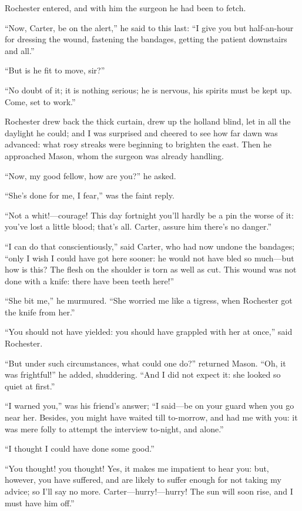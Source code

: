 \Mr{} Rochester entered, and with him the surgeon he had been to fetch.

\enquote{Now, Carter, be on the alert,} he said to this last: \enquote{I
give you but half-an-hour for dressing the wound, fastening the
bandages, getting the patient downstairs and all.}

\enquote{But is he fit to move, sir?}

\enquote{No doubt of it; it is nothing serious; he is nervous, his
spirits must be kept up. Come, set to work.}

\Mr{} Rochester drew back the thick curtain, drew up the holland blind,
let in all the daylight he could; and I was surprised and cheered to see
how far dawn was advanced: what rosy streaks were beginning to brighten
the east. Then he approached Mason, whom the surgeon was already
handling.

\enquote{Now, my good fellow, how are you?} he asked.

\enquote{She's done for me, I fear,} was the faint reply.

\enquote{Not a whit!---courage! This day fortnight you'll hardly be a
pin the worse of it: you've lost a little blood; that's all. Carter,
assure him there's no danger.}

\enquote{I can do that conscientiously,} said Carter, who had now undone
the bandages; \enquote{only I wish I could have got here sooner: he
would not have bled so much---but how is this? The flesh on the
shoulder is torn as well as cut. This wound was not done with a knife:
there have been teeth here!}

\enquote{She bit me,} he murmured. \enquote{She worried me like a
tigress, when Rochester got the knife from her.}

\enquote{You should not have yielded: you should have grappled with her
at once,} said \Mr{} Rochester.

\enquote{But under such circumstances, what could one do?} returned
Mason. \enquote{Oh, it was frightful!} he added, shuddering. 
\enquote{And I did not expect it: she looked so quiet at first.}

\enquote{I warned you,} was his friend's answer; \enquote{I said---be on
your guard when you go near her. Besides, you might have waited till
to-morrow, and had me with you: it was mere folly to attempt the
interview to-night, and alone.}

\enquote{I thought I could have done some good.}

\enquote{You thought! you thought! Yes, it makes me impatient to hear
you: but, however, you have suffered, and are likely to suffer enough
for not taking my advice; so I'll say no more. 
Carter---hurry!---hurry! The sun will soon rise, and I must have him
off.}

